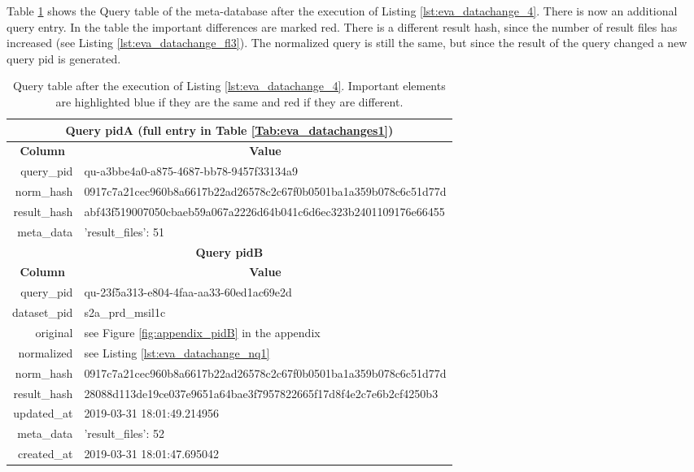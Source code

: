\documentclass[draft,final]{vutinfth} %
\begin{document}
\begin{enumerate}
Table \ref{Tab:eva_datachanges3} shows the Query table of the meta-database after the execution of Listing \ref{lst:eva_datachange_4}. There is now an additional query entry. In the table the important differences are marked red. There is a different result hash, since the number of result files has increased (see Listing \ref{lst:eva_datachange_fl3}). The normalized query is still the same, but since the result of the query changed a new query pid is generated. 

	\begin{table}[]
	\caption{Query table after the execution of Listing \ref{lst:eva_datachange_4}. Important elements are highlighted blue if they are the same and red if they are different.}
	\centering
	\begin{tabular}{|r|l|}
		\hline \multicolumn{2}{|c|}{\textbf{Query pidA (full entry in Table \ref{Tab:eva_datachanges1})}} \\
		\hline \multicolumn{1}{|c|}{\textbf{Column}}  &  \multicolumn{1}{c|}{\textbf{Value}} \\ \hline
		query\_pid & {\color{red}qu-a3bbe4a0-a875-4687-bb78-9457f33134a9}  \\ 
		norm\_hash & {\color{blue}0917c7a21cec960b8a6617b22ad26578c2c67f0b0501ba1a359b078c6c51d77d}  \\
		result\_hash & {\color{red}abf43f519007050cbaeb59a067a2226d64b041c6d6ec323b2401109176e66455}   \\
		meta\_data & {'result\_files': 51}  \\
		\hline \multicolumn{2}{|c|}{\textbf{Query pidB}} \\
		\hline \multicolumn{1}{|c|}{\textbf{Column}}  &  \multicolumn{1}{c|}{\textbf{Value}} \\ \hline
		query\_pid & { \color{red} qu-23f5a313-e804-4faa-aa33-60ed1ac69e2d}  \\ 
		dataset\_pid & s2a\_prd\_msil1c  \\ 
		original & see Figure \ref{fig:appendix_pidB} in the appendix \\
		normalized & see Listing \ref{lst:eva_datachange_nq1}  \\
		norm\_hash & {\color{blue}0917c7a21cec960b8a6617b22ad26578c2c67f0b0501ba1a359b078c6c51d77d}  \\
		result\_hash & {\color{red}28088d113de19ce037e9651a64bae3f7957822665f17d8f4e2c7e6b2cf4250b3 }  \\
		updated\_at & 2019-03-31 18:01:49.214956   \\
		meta\_data & {\color{red}'result\_files': 52}  \\
		created\_at & 2019-03-31 18:01:47.695042   \\ \hline
	\end{tabular}
	\label{Tab:eva_datachanges3}
\end{table}


\end{enumerate}
\end{document}
